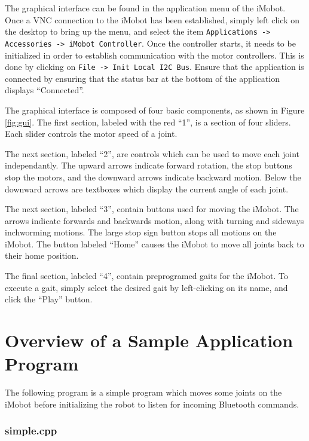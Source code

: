 \documentclass[11pt]{report}
\begin{document}
The graphical interface can be found in the application menu of the iMobot. Once
a VNC connection to the iMobot has been established, simply left click on the
desktop to bring up the menu, and select the item \texttt{Applications ->
Accessories -> iMobot Controller}. Once the controller starts, it needs to be
initialized in order to establish communication with the motor controllers.
This is done by clicking on \texttt{File -> Init Local I2C Bus}. Ensure that 
the application is connected by ensuring that the status bar at the bottom of the
application displays ``Connected''. 

The graphical interface is composed of four basic components, as shown in
Figure \ref{fig:gui}. The first section, labeled with the red ``1'',
is a section of four sliders. Each slider controls the motor speed of a joint.

The next section, labeled ``2'', are controls which can be used to move each
joint independantly. The upward arrows indicate forward rotation, the stop
buttons stop the motors, and the downward arrows indicate backward motion.
Below the downward arrows are textboxes which display the current angle of each
joint.

The next section, labeled ``3'', contain buttons used for moving the iMobot. 
The arrows indicate forwards and backwards motion, along with turning and
sideways inchworming motions. The large stop sign button stops all motions
on the iMobot. The button labeled ``Home'' causes the iMobot to move all joints
back to their home position. 

The final section, labeled ``4'', contain preprogramed gaits for the iMobot.
To execute a gait, simply select the desired gait by left-clicking on its name,
and click the ``Play'' button.

\chapter{Overview of a Sample Application Program}
The following program is a simple program which moves some joints on the iMobot
before initializing the robot to listen for incoming Bluetooth commands.
\subsection{simple.cpp \label{subsec:simple.cpp}}
\end{document}
